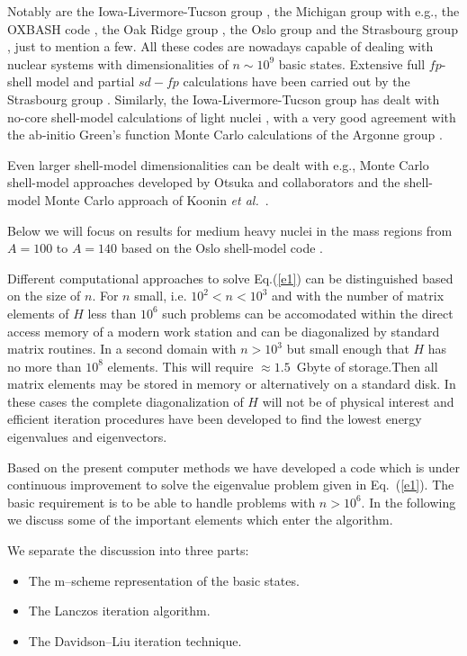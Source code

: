 \documentclass[twoside,12pt]{article}
\begin{document}
Notably are 
the Iowa-Livermore-Tucson group \cite{petr_erich2002}, the Michigan group with e.g., the OXBASH code
\cite{alex,mihai1,mihai2},
the Oak Ridge group \cite{andrius}, the Oslo group
\cite{oslo1} and 
the Strasbourg group \cite{etienne1}, just to mention a few. 
All these codes are nowadays capable of 
dealing with nuclear systems with dimensionalities of $n \sim 10^{9}$ basic states.
Extensive full $fp$-shell model and partial $sd-fp$ 
calculations have been carried out by the Strasbourg group
\cite{etienne2,etienne3,etienne4,etienne6}. 
Similarly, the Iowa-Livermore-Tucson group has dealt with
no-core shell-model calculations of light nuclei \cite{bruce1,bruce2,bruce3,bruce4}, 
with a very good agreement with the 
ab-initio Green's function Monte Carlo calculations of the Argonne group \cite{bob1,bob2,bob3}. 

Even larger shell-model dimensionalities can be dealt with e.g., Monte Carlo shell-model
approaches developed by Otsuka and collaborators \cite{taka1,taka2,taka3} and the shell-model
Monte Carlo approach of Koonin {\em et al.}~\cite{r:smmc_pr}.

Below we will focus on results for medium heavy nuclei in the mass regions from
$A=100$ to $A=140$ based on the Oslo shell-model code \cite{oslo1}.


Different computational approaches to solve Eq.(\ref{e1}) can
be distinguished
based on the size of $n$.
For $n$ small, i.e. $10^2 < n < 10^3$ and with  the number of
matrix elements of $H$
less than $10^6$ such  problems can be accomodated within the direct
access memory of a modern work station and can be diagonalized by
standard matrix routines.
In a second domain  with  $ n > 10^3$ but small enough that $H$
has no more than $10^8$ elements. This will require $\approx 1.5$~Gbyte
of storage.Then all matrix elements may be stored in memory
or alternatively on a standard disk.
In these cases the complete diagonalization of
$H$ will not be of physical interest and efficient iteration
procedures have been developed to find the lowest energy eigenvalues
and eigenvectors.

Based on the present computer methods we have developed a code
which is under continuous improvement
to solve the eigenvalue problem given in Eq.~(\ref{e1}).
The basic requirement
is to be able to handle problems with $n > 10^6$. In the following
we discuss some of the important elements which enter the algorithm.

We separate the discussion into three parts:
%
\begin{itemize}
%
\item The m--scheme representation of the basic states.
%
\item The Lanczos iteration algorithm.
%
\item The Davidson--Liu iteration technique.
%
\end{itemize}
%
\end{document}
